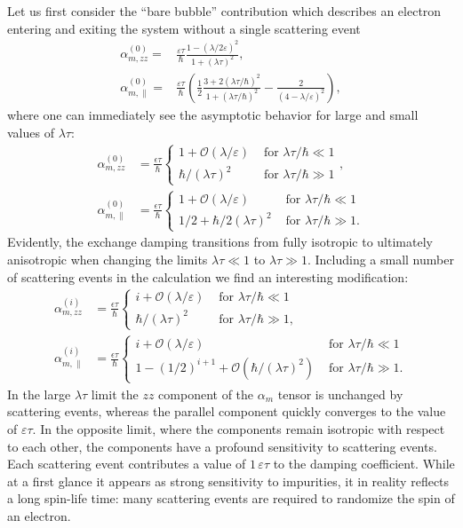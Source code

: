 Let us first consider the ``bare bubble'' contribution which describes an electron entering and exiting the system without a single scattering event
\begin{align}
    \alpha_{m,zz}^{(0)} =  & \frac{\varepsilon\tau}{\hbar} \frac{1-(\lambda/2\varepsilon)^2}{1+(\lambda\tau)^2},\\
    \alpha_{m,\parallel}^{(0)} =  & \frac{\varepsilon\tau}{\hbar}\left(\frac{1}{2}\frac{3+2(\lambda\tau/\hbar)^2}{1+(\lambda\tau/\hbar)^2}-\frac{2}{(4-\lambda/\varepsilon)^2}\right),
\end{align}
where one can immediately see the asymptotic behavior for large and small values of $\lambda\tau$:
\begin{align}
    \alpha_{m,zz}^{(0)}  & = \frac{\epsilon\tau}{\hbar}\begin{cases}
    1  +\mathcal{O}(\lambda/\varepsilon)  & \text{ for }\lambda\tau/\hbar\ll1\\
    \hbar/(\lambda\tau)^2 & \text{ for }\lambda\tau/\hbar\gg1
    \end{cases},\\
    \alpha_{m,\parallel}^{(0)}  & = \frac{\epsilon\tau}{\hbar}\begin{cases}
    1  +\mathcal{O}(\lambda/\varepsilon)  & \text{ for }\lambda\tau/\hbar\ll1\\
    1/2 + \hbar/2(\lambda\tau)^2 & \text{ for }\lambda\tau/\hbar\gg1.
    \end{cases}
\end{align}
Evidently, the exchange damping transitions from fully isotropic to ultimately anisotropic when changing the limits $\lambda\tau\ll1$ to $\lambda\tau\gg1$. 
Including a small number of scattering events in the calculation we find an interesting modification:
\begin{align}
    \alpha_{m,zz}^{(i)}  & = \frac{\epsilon\tau}{\hbar}\begin{cases}
    i + \mathcal{O}(\lambda/\varepsilon)  & \text{ for }\lambda\tau/\hbar\ll1\\
    \hbar/(\lambda\tau)^2 & \text{ for }\lambda\tau/\hbar\gg1,
    \end{cases}\\
    \alpha_{m,\parallel}^{(i)}  &  = \frac{\epsilon\tau}{\hbar}\begin{cases}
    i + \mathcal{O}(\lambda/\varepsilon)  & \text{ for }\lambda\tau/\hbar\ll1\\
    1-(1/2)^{i+1}+\mathcal{O}(\hbar/(\lambda\tau)^2) & \text{ for }\lambda\tau/\hbar\gg1.
    \end{cases}
\end{align}
In the large $\lambda\tau$ limit the $zz$ component of the $\alpha_m$ tensor is unchanged by scattering events, whereas the parallel component quickly converges to the value of $\varepsilon\tau$. In the opposite limit, where the components remain isotropic with respect to each other, the components have a profound sensitivity to scattering events. Each scattering event contributes a value of $1\,\varepsilon\tau$ to the damping coefficient. While at a first glance it appears as strong sensitivity to impurities, it in reality reflects a long spin-life time: many scattering events are required to randomize the spin of an electron. 

